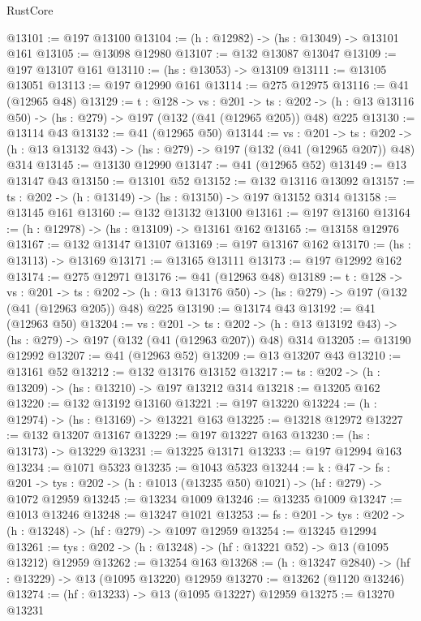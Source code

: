 \begin{lexlean}{RustCore}
\begin{coremodule}
@13101 := @197 @13100
@13104 := (h : @12982) -> (hs : @13049) -> @13101 @161
@13105 := @13098 @12980
@13107 := @132 @13087 @13047
@13109 := @197 @13107 @161
@13110 := (hs : @13053) -> @13109
@13111 := @13105 @13051
@13113 := @197 @12990 @161
@13114 := @275 @12975
@13116 := @41 (@12965 @48)
@13129 := {t : @128} ->
  {vs : @201} ->
  {ts : @202} -> (h : @13 @13116 @50) -> (hs : @279) -> @197 (@132 (@41 (@12965 @205)) @48) @225
@13130 := @13114 @43
@13132 := @41 (@12965 @50)
@13144 := {vs : @201} ->
  {ts : @202} -> (h : @13 @13132 @43) -> (hs : @279) -> @197 (@132 (@41 (@12965 @207)) @48) @314
@13145 := @13130 @12990
@13147 := @41 (@12965 @52)
@13149 := @13 @13147 @43
@13150 := @13101 @52
@13152 := @132 @13116 @13092
@13157 := {ts : @202} -> (h : @13149) -> (hs : @13150) -> @197 @13152 @314
@13158 := @13145 @161
@13160 := @132 @13132 @13100
@13161 := @197 @13160
@13164 := (h : @12978) -> (hs : @13109) -> @13161 @162
@13165 := @13158 @12976
@13167 := @132 @13147 @13107
@13169 := @197 @13167 @162
@13170 := (hs : @13113) -> @13169
@13171 := @13165 @13111
@13173 := @197 @12992 @162
@13174 := @275 @12971
@13176 := @41 (@12963 @48)
@13189 := {t : @128} ->
  {vs : @201} ->
  {ts : @202} -> (h : @13 @13176 @50) -> (hs : @279) -> @197 (@132 (@41 (@12963 @205)) @48) @225
@13190 := @13174 @43
@13192 := @41 (@12963 @50)
@13204 := {vs : @201} ->
  {ts : @202} -> (h : @13 @13192 @43) -> (hs : @279) -> @197 (@132 (@41 (@12963 @207)) @48) @314
@13205 := @13190 @12992
@13207 := @41 (@12963 @52)
@13209 := @13 @13207 @43
@13210 := @13161 @52
@13212 := @132 @13176 @13152
@13217 := {ts : @202} -> (h : @13209) -> (hs : @13210) -> @197 @13212 @314
@13218 := @13205 @162
@13220 := @132 @13192 @13160
@13221 := @197 @13220
@13224 := (h : @12974) -> (hs : @13169) -> @13221 @163
@13225 := @13218 @12972
@13227 := @132 @13207 @13167
@13229 := @197 @13227 @163
@13230 := (hs : @13173) -> @13229
@13231 := @13225 @13171
@13233 := @197 @12994 @163
@13234 := @1071 @5323
@13235 := @1043 @5323
@13244 := {k : @47} ->
  {fs : @201} -> {tys : @202} -> (h : @1013 (@13235 @50) @1021) -> (hf : @279) -> @1072 @12959
@13245 := @13234 @1009
@13246 := @13235 @1009
@13247 := @1013 @13246
@13248 := @13247 @1021
@13253 := {fs : @201} -> {tys : @202} -> (h : @13248) -> (hf : @279) -> @1097 @12959
@13254 := @13245 @12994
@13261 := {tys : @202} -> (h : @13248) -> (hf : @13221 @52) -> @13 (@1095 @13212) @12959
@13262 := @13254 @163
@13268 := (h : @13247 @2840) -> (hf : @13229) -> @13 (@1095 @13220) @12959
@13270 := @13262 (@1120 @13246)
@13274 := (hf : @13233) -> @13 (@1095 @13227) @12959
@13275 := @13270 @13231

\end{coremodule}
\end{lexlean}

